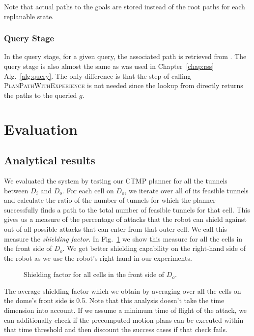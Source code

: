 \documentclass[a4paper]{report}
\begin{document}
Note that actual paths to the goals are stored instead of the root paths for each replanable state.

\subsubsection{Query Stage}
In the query stage, for a given query, the associated path is retrieved from \calM.
The query stage is also almost the same as was used in Chapter~\ref{chap:rss} Alg.~\ref{alg:query}. The only difference is that the step of calling \textsc{PlanPathWithExperience} is not needed since the lookup from \calM directly returns the paths to the queried $g$.

\section{Evaluation}
\subsection{Analytical results}
We evaluated the system by testing our CTMP planner for all the tunnels between $D_i$ and $D_o$. For each cell on $D_o$, we iterate over all of its feasible tunnels and calculate the ratio of the number of tunnels for which the planner successfully finds a path to the total number of feasible tunnels for that cell. This gives us a measure of the percentage of attacks that the robot can shield against out of all possible attacks that can enter from that outer cell. We call this measure the \emph{shielding factor}. In Fig.~\ref{fig:coverage_front} we show this measure for all the cells in the front side of $D_o$. We get better shielding capability on the right-hand side of the robot as we use the robot's right hand in our experiments.

\begin{figure}[ht]
\centering
\caption{Shielding factor for all cells in the front side of $D_o$.}
\label{fig:coverage_front}
\end{figure}

The average shielding factor which we obtain by averaging over all the cells on the dome's front side is 0.5. Note that this analysis doesn't take the time dimension into account. If we assume a minimum time of flight of the attack, we can additionally check if the precomputed motion plans can be executed within that time threshold and then discount the success cases if that check fails.
\end{document}
